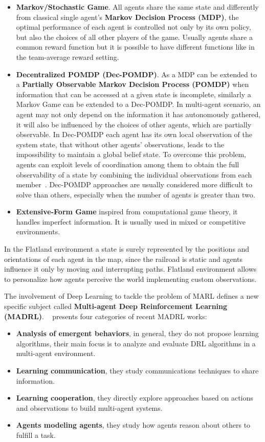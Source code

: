 \documentclass[11pt, a4paper, hidelinks]{report}
\begin{document}
\begin{itemize}
	\item \textbf{Markov/Stochastic Game}.
All agents share the same state and differently from classical single agent's \textbf{Markov Decision Process (MDP)}, the optimal performance of each agent is controlled not only by its own policy, but also the choices of all other players of the game.
Usually agents share a common reward function but it is possible to have different functions like in the team-average reward setting.
	\item \textbf{Decentralized POMDP (Dec-POMDP)}.
As a MDP can be extended to a \textbf{Partially Observable Markov Decision Process (POMDP)} when information that can be accessed at a given state is incomplete, similarly a Markov Game can be extended to a Dec-POMDP\@.
In multi-agent scenario, an agent may not only depend on the information it has autonomously gathered, it will also be influenced by the choices of other agents, which are partially observable.
In Dec-POMDP each agent has its own local observation of the system state, that without other agents' observations, leads to the impossibility to maintain a global belief state.
To overcome this problem, agents can exploit levels of coordination among them to obtain the full observability of a state by combining the individual observations from each member~\citep{castaneda}.
Dec-POMDP approaches are usually considered more difficult to solve than others, especially when the number of agents is greater than two.
	\item \textbf{Extensive-Form Game} inspired from computational game theory, it handles imperfect information.
It is usually used in mixed or competitive environments.
\end{itemize}

In the Flatland environment a state is surely represented by the positions and orientations of each agent in the map, since the railroad is static and agents influence it only by moving and interrupting paths.
Flatland environment allows to personalize how agents perceive the world implementing custom observations.

The involvement of Deep Learning to tackle the problem of MARL defines a new specific subject called \textbf{Multi-agent Deep Reinforcement Learning (MADRL)}.
~\citep{Hernandez-Leal-2019} presents four categories of recent MADRL works:
\begin{itemize}
	\item \textbf{Analysis of emergent behaviors}, in general, they do not propose learning algorithms, their main focus is to analyze and evaluate DRL algorithms in a multi-agent environment.
	\item \textbf{Learning communication}, they study communications techniques to share information.
	\item \textbf{Learning cooperation}, they directly explore approaches based on actions and observations to build multi-agent systems.
	\item \textbf{Agents modeling agents}, they study how agents reason about others to fulfill a task.
\end{itemize}
\end{document}
